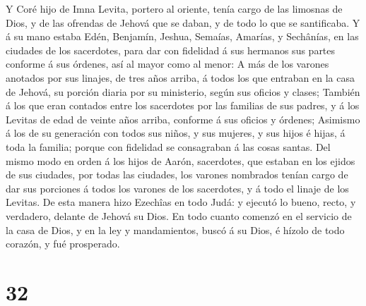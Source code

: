  Y Coré hijo de Imna Levita, portero al oriente, tenía
cargo de las limosnas de Dios, y de las ofrendas de Jehová que se daban,
y de todo lo que se santificaba.  Y á su mano estaba
Edén, Benjamín, Jeshua, Semaías, Amarías, y Sechânías, en las ciudades
de los sacerdotes, para dar con fidelidad á sus hermanos sus partes
conforme á sus órdenes, así al mayor como al menor:  A
más de los varones anotados por sus linajes, de tres años arriba, á
todos los que entraban en la casa de Jehová, su porción diaria por su
ministerio, según sus oficios y clases;  También á los
que eran contados entre los sacerdotes por las familias de sus padres, y
á los Levitas de edad de veinte años arriba, conforme á sus oficios y
órdenes;  Asimismo á los de su generación con todos sus
niños, y sus mujeres, y sus hijos é hijas, á toda la familia; porque con
fidelidad se consagraban á las cosas santas.  Del mismo
modo en orden á los hijos de Aarón, sacerdotes, que estaban en los
ejidos de sus ciudades, por todas las ciudades, los varones nombrados
tenían cargo de dar sus porciones á todos los varones de los sacerdotes,
y á todo el linaje de los Levitas.  De esta manera hizo
Ezechîas en todo Judá: y ejecutó lo bueno, recto, y verdadero, delante
de Jehová su Dios.  En todo cuanto comenzó en el servicio
de la casa de Dios, y en la ley y mandamientos, buscó á su Dios, é
hízolo de todo corazón, y fué prosperado.

\hypertarget{section-31}{%
\section{32}\label{section-31}}

